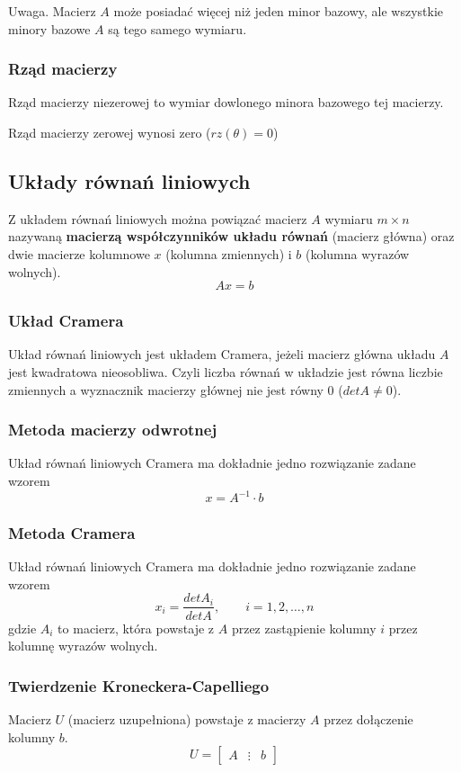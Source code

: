 \documentclass[../Matematyka.tex]{subfiles}
\begin{document}
    Uwaga. Macierz \(A\) może posiadać więcej niż jeden minor bazowy, ale wszystkie minory bazowe \(A\) są tego samego wymiaru.

    \subsubsection{Rząd macierzy}
    Rząd macierzy niezerowej to wymiar dowlonego minora bazowego tej macierzy.

    Rząd macierzy zerowej wynosi zero (\(rz(\theta) = 0\))

    \subsection{Układy równań liniowych}
    Z układem równań liniowych można powiązać macierz \(A\) wymiaru \(m \times n\) nazywaną \textbf{macierzą współczynników układu równań} (macierz główna) 
    oraz dwie macierze kolumnowe \(x\) (kolumna zmiennych) i \(b\) (kolumna wyrazów wolnych).
    \[Ax = b\]

    \subsubsection{Układ Cramera}
    Układ równań liniowych jest układem Cramera, jeżeli macierz główna układu \(A\) jest kwadratowa nieosobliwa.
    Czyli liczba równań w układzie jest równa liczbie zmiennych a wyznacznik macierzy głównej nie jest równy 0 (\(detA \neq 0\)).

    \subsubsection{Metoda macierzy odwrotnej}
    Układ równań liniowych Cramera ma dokładnie jedno rozwiązanie zadane wzorem
    \[x = A^{-1} \cdot b\]

    \subsubsection{Metoda Cramera}
    Układ równań liniowych Cramera ma dokładnie jedno rozwiązanie zadane wzorem
    \begin{displaymath}
        x_i = \frac{detA_i}{detA},
        \qquad
        i = 1, 2, \dots, n
    \end{displaymath}
    gdzie \(A_i\) to macierz, która powstaje z \(A\) przez zastąpienie kolumny \(i\) przez kolumnę wyrazów wolnych.

    \subsubsection{Twierdzenie Kroneckera-Capelliego}
    Macierz \(U\) (macierz uzupełniona) powstaje z macierzy \(A\) przez dołączenie kolumny \(b\).
    \begin{displaymath}
        U =
        \begin{bmatrix}
            A & \vdots & b
        \end{bmatrix}
    \end{displaymath}
\end{document}
